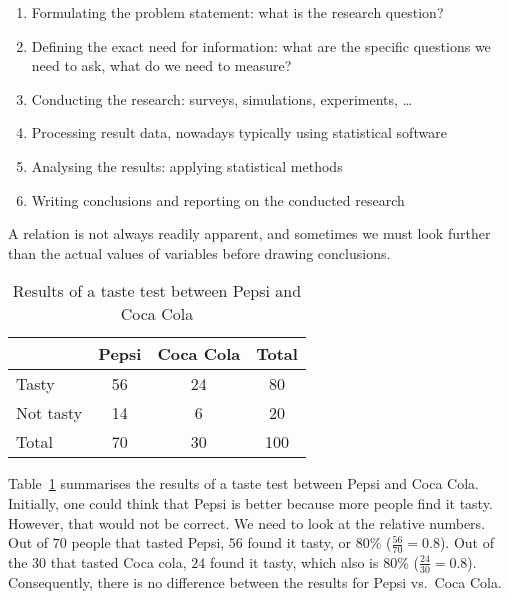 \begin{enumerate}
	\item Formulating the problem statement: what is the research question?
	\item Defining the exact need for information: what are the specific questions we need to ask, what do we need to measure?
	\item Conducting the research: surveys, simulations, experiments, \dots
	\item Processing result data, nowadays typically using statistical software
	\item Analysing the results: applying statistical methods
	\item Writing conclusions and reporting on the conducted research
\end{enumerate}

A relation is not always readily apparent, and sometimes we must look further than the actual values of variables before drawing conclusions.

\begin{example}
    
    \begin{table}
    \centering
    \begin{tabular}{l||c|c||c}
        & Pepsi & Coca Cola & Total \\
        \hline \hline
        Tasty & 56 & 24 & 80 \\
        \hline
        Not tasty & 14 & 6 & 20 \\
        \hline \hline
        Total & 70 & 30 & 100
    \end{tabular}
    \caption{Results of a taste test between Pepsi and Coca Cola}
    \label{tab:pepsi-coca-cola}
    \end{table}

    Table~\ref{tab:pepsi-coca-cola} summarises the results of a taste test between Pepsi and Coca Cola. Initially, one could think that Pepsi is better because more people find it tasty. However, that would not be correct. We need to look at the relative numbers. Out of $70$ people that tasted Pepsi, $56$ found it tasty, or $80\%$ ($\frac{56}{70} = 0.8$). Out of the $30$ that tasted Coca cola, $24$ found it tasty, which also is $80\%$ ($\frac{24}{30} = 0.8$). Consequently, there is no difference between the results for Pepsi vs.~Coca Cola.
\end{example}
